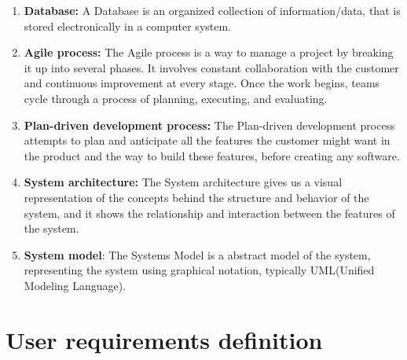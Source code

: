 \documentclass{article}
\begin{document}
\begin{enumerate}
    \item \textbf{Database:} A Database is an organized collection of information/data, that is stored electronically in a computer system.
    \item \textbf{Agile process:} The Agile process is a way to manage a project by breaking it up into several phases. It involves constant collaboration with the customer and continuous improvement at every stage. Once the work begins, teams cycle through a process of planning, executing, and evaluating.
    \item \textbf{Plan-driven development process:} The Plan-driven development process attempts to plan and anticipate all the features the customer might want in the product and the way to build these features, before creating any software.  
    \item \textbf{System architecture:} The System architecture gives us a visual representation of the concepts behind the structure and behavior of the system, and it shows the relationship and interaction between the features of the system.
    \item \textbf{System model}: The Systems Model is a abstract model of the system, representing the system using graphical notation, typically UML(Unified Modeling Language). 
\end{enumerate}

\newpage

\section*{User requirements definition}

\vspace{5 mm}
\end{document}
